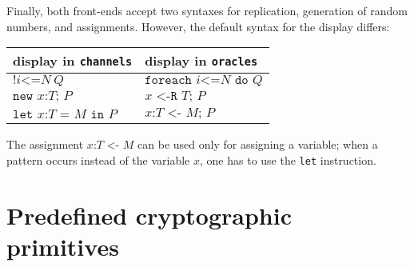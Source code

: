 \documentclass{article}
\begin{document}
Finally, both front-ends accept two syntaxes for replication,
generation of random numbers, and assignments. However, 
the default syntax for the display differs:
\begin{center}
\begin{tabular}{l|l}
display in \texttt{channels}&display in \texttt{oracles}\\
\hline
$\texttt{!}i\texttt{<=}N\ Q$& $\texttt{foreach }i\texttt{<=}N\texttt{ do }Q$\\
$\texttt{new }x\texttt{:}T\texttt{; }P$&$x\texttt{ <-R }T\texttt{; }P$\\
$\texttt{let }x\texttt{:}T\texttt{ = }M\texttt{ in }P$&$x\texttt{:}T\texttt{ <- }M\texttt{; }P$\\
\end{tabular}
\end{center}
The assignment $x\texttt{:}T\texttt{ <- }M$ can be
used only for assigning a variable; when a pattern occurs instead
of the variable $x$, one has to use the \texttt{let} instruction.

\section{Predefined cryptographic primitives}\label{sect:prim}

\newcommand{\vn}[1]{\mathit{#1}}
\newcommand{\ab}{\allowbreak}

\sloppy
\end{document}
